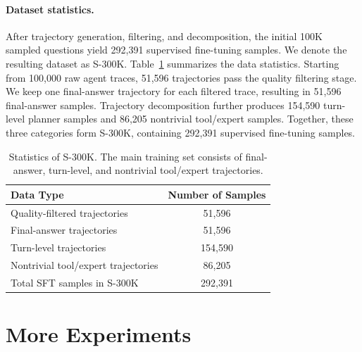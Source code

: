 \paragraph{Dataset statistics.}
After trajectory generation, filtering, and decomposition, the initial 100K sampled questions yield 292,391 supervised fine-tuning samples. 
We denote the resulting dataset as \textsc{S-300K}. 
Table~\ref{tab:s300k_statistics} summarizes the data statistics. 
Starting from 100,000 raw agent traces, 51,596 trajectories pass the quality filtering stage. 
We keep one final-answer trajectory for each filtered trace, resulting in 51,596 final-answer samples. 
Trajectory decomposition further produces 154,590 turn-level planner samples and 86,205 nontrivial tool/expert samples. 
Together, these three categories form \textsc{S-300K}, containing 292,391 supervised fine-tuning samples. 

\begin{table}[h]
\centering
\small
\begin{tabular}{lc}
\toprule
\textbf{Data Type} & \textbf{Number of Samples} \\
\midrule
Quality-filtered trajectories & 51,596 \\
\midrule
Final-answer trajectories & 51,596 \\
Turn-level trajectories & 154,590 \\
Nontrivial tool/expert trajectories & 86,205 \\
\midrule
Total SFT samples in \textsc{S-300K} & 292,391 \\
\bottomrule
\end{tabular}
\vspace{0.2cm}
\caption{Statistics of \textsc{S-300K}. The main training set consists of final-answer, turn-level, and nontrivial tool/expert trajectories.}
\label{tab:s300k_statistics}
\end{table}



\section{More Experiments}
\label{app:more_experiments}

